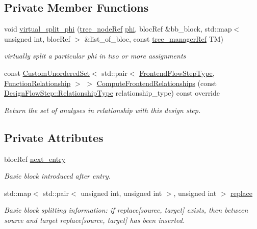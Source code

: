 \subsection*{Private Member Functions}
\begin{DoxyCompactItemize}
\item 
void \hyperlink{classvirtual__phi__nodes__split_a91b2c477a5cec0ee3a6882c187f03a53}{virtual\+\_\+split\+\_\+phi} (\hyperlink{tree__node_8hpp_a6ee377554d1c4871ad66a337eaa67fd5}{tree\+\_\+node\+Ref} \hyperlink{cdfc__module__binding_8hpp_aeea0bcf1696c7f3fa2891f0a8e106706acc026b1a09b99cfe9d1eefb44256d4ec}{phi}, bloc\+Ref \&bb\+\_\+block, std\+::map$<$ unsigned int, bloc\+Ref $>$ \&list\+\_\+of\+\_\+bloc, const \hyperlink{tree__manager_8hpp_a96ff150c071ce11a9a7a1e40590f205e}{tree\+\_\+manager\+Ref} TM)
\begin{DoxyCompactList}\small\item\em virtually split a particular phi in two or more assignments \end{DoxyCompactList}\item 
const \hyperlink{classCustomUnorderedSet}{Custom\+Unordered\+Set}$<$ std\+::pair$<$ \hyperlink{frontend__flow__step_8hpp_afeb3716c693d2b2e4ed3e6d04c3b63bb}{Frontend\+Flow\+Step\+Type}, \hyperlink{classFrontendFlowStep_af7cf30f2023e5b99e637dc2058289ab0}{Function\+Relationship} $>$ $>$ \hyperlink{classvirtual__phi__nodes__split_ab462ea81dbc8a5df62b618c58387061c}{Compute\+Frontend\+Relationships} (const \hyperlink{classDesignFlowStep_a723a3baf19ff2ceb77bc13e099d0b1b7}{Design\+Flow\+Step\+::\+Relationship\+Type} relationship\+\_\+type) const override
\begin{DoxyCompactList}\small\item\em Return the set of analyses in relationship with this design step. \end{DoxyCompactList}\end{DoxyCompactItemize}
\subsection*{Private Attributes}
\begin{DoxyCompactItemize}
\item 
bloc\+Ref \hyperlink{classvirtual__phi__nodes__split_a5f78a71c01295fface9f972fae355367}{next\+\_\+entry}
\begin{DoxyCompactList}\small\item\em Basic block introduced after entry. \end{DoxyCompactList}\item 
std\+::map$<$ std\+::pair$<$ unsigned int, unsigned int $>$, unsigned int $>$ \hyperlink{classvirtual__phi__nodes__split_a602292dc76cb77744e814f4e83412816}{replace}
\begin{DoxyCompactList}\small\item\em Basic block splitting information\+: if replace\mbox{[}source, target\mbox{]} exists, then between source and target replace\mbox{[}source, target\mbox{]} has been inserted. \end{DoxyCompactList}\end{DoxyCompactItemize}
